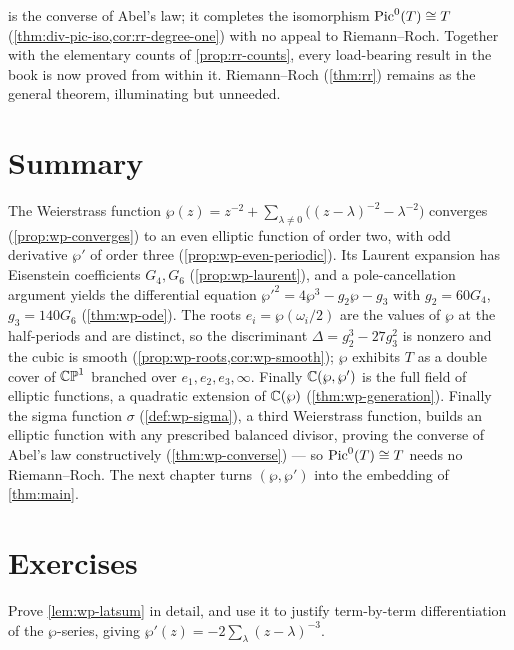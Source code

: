 \begin{remark}
\label{rem:wp-selfcontained}
 is the converse of Abel's law; it completes the isomorphism
\(\operatorname{Pic}^0(T) \cong T\) (\cref{thm:div-pic-iso,cor:rr-degree-one}) with no appeal to
Riemann--Roch. Together with the elementary counts of \cref{prop:rr-counts}, every
load-bearing result in the book is now proved from within it. Riemann--Roch
(\cref{thm:rr}) remains as the general theorem, illuminating but unneeded.
\end{remark}

\section{Summary}
\label{sec:wp-summary}

The Weierstrass function \(\wp(z) = z^{-2} + \sum_{\lambda \ne 0}\bigl((z-\lambda)^{-2}
- \lambda^{-2}\bigr)\) converges (\cref{prop:wp-converges}) to an even elliptic
function of order two, with odd derivative \(\wp'\) of order three
(\cref{prop:wp-even-periodic}). Its Laurent expansion has Eisenstein coefficients
\(G_4, G_6\) (\cref{prop:wp-laurent}), and a pole-cancellation argument yields the
differential equation \(\wp'^2 = 4\wp^3 - g_2\wp - g_3\) with \(g_2 = 60G_4\),
\(g_3 = 140G_6\) (\cref{thm:wp-ode}). The roots \(e_i = \wp(\omega_i/2)\) are the
values of \(\wp\) at the half-periods and are distinct, so the discriminant
\(\Delta = g_2^3 - 27g_3^2\) is nonzero and the cubic is smooth
(\cref{prop:wp-roots,cor:wp-smooth}); \(\wp\) exhibits \(T\) as a double cover of
\(\mathbb{CP}^1\) branched over \(e_1, e_2, e_3, \infty\). Finally \(\mathbb{C}(\wp, \wp')\) is the
full field of elliptic functions, a quadratic extension of \(\mathbb{C}(\wp)\)
(\cref{thm:wp-generation}). Finally the sigma function \(\sigma\)
(\cref{def:wp-sigma}), a third Weierstrass function, builds an elliptic function
with any prescribed balanced divisor, proving the converse of Abel's law
constructively (\cref{thm:wp-converse}) --- so \(\operatorname{Pic}^0(T) \cong T\) needs no
Riemann--Roch. The next chapter turns \((\wp, \wp')\) into the embedding of
\cref{thm:main}.

\section*{Exercises}

\begin{exercise}
\label{ex:wp-convergence}
Prove \cref{lem:wp-latsum} in detail, and use it to justify term-by-term
differentiation of the \(\wp\)-series, giving
\(\wp'(z) = -2\sum_{\lambda}(z-\lambda)^{-3}\).
\end{exercise}

